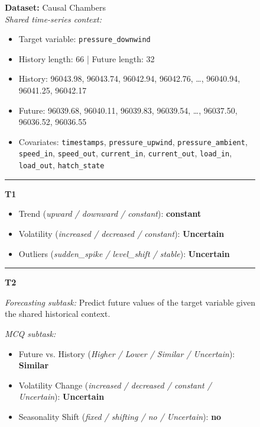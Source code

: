 \begin{figure}[htbp]
\centering
\begin{tcolorbox}[
  colback=gray!6,
  colframe=black!20,
  boxrule=0.5pt,
  arc=3pt,
  left=6pt,right=6pt,top=6pt,bottom=6pt
]
\textbf{Dataset:} Causal Chambers \\

\emph{Shared time-series context:}
\begin{itemize}[leftmargin=1.1em,itemsep=0pt,topsep=0pt,parsep=0pt,partopsep=0pt]
  \item Target variable: \texttt{pressure\_downwind}
  \item History length: 66 \quad | \quad Future length: 32
  \item History: 96043.98, 96043.74, 96042.94, 96042.76, \ldots, 96040.94, 96041.25, 96042.17
  \item Future: 96039.68, 96040.11, 96039.83, 96039.54, \ldots, 96037.50, 96036.52, 96036.55
  \item Covariates:
  \texttt{timestamps}, \texttt{pressure\_upwind}, \texttt{pressure\_ambient},
  \texttt{speed\_in}, \texttt{speed\_out}, \texttt{current\_in}, \texttt{current\_out},
  \texttt{load\_in}, \texttt{load\_out}, \texttt{hatch\_state}
\end{itemize}

\hrule\vspace{4pt}

\textbf{T1}
\begin{itemize}[leftmargin=1.1em,itemsep=0pt,topsep=0pt,parsep=0pt,partopsep=0pt]
  \item Trend (\textit{upward / downward / constant}): \textbf{constant}
  \item Volatility (\textit{increased / decreased / constant}): \textbf{Uncertain}
  \item Outliers (\textit{sudden\_spike / level\_shift / stable}): \textbf{Uncertain}
\end{itemize}

\vspace{3pt}\hrule\vspace{4pt}

\textbf{T2}

\emph{Forecasting subtask:}
Predict future values of the target variable given the shared historical context.

\emph{MCQ subtask:}
\begin{itemize}[leftmargin=1.1em,itemsep=0pt,topsep=0pt,parsep=0pt,partopsep=0pt]
  \item Future vs. History
  (\textit{Higher / Lower / Similar / Uncertain}): \textbf{Similar}
  \item Volatility Change
  (\textit{increased / decreased / constant / Uncertain}): \textbf{Uncertain}
  \item Seasonality Shift
  (\textit{fixed / shifting / no / Uncertain}): \textbf{no}
\end{itemize}


\end{tcolorbox}
\end{figure}
